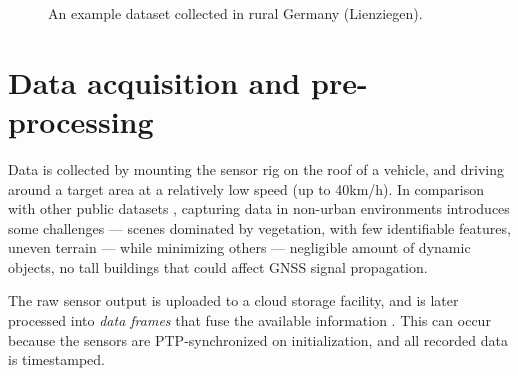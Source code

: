 \begin{figure}
	\centering
	\hspace{1pt}
	\caption[Example dataset trajectory]{An example dataset collected in rural Germany (Lienziegen).}
	\label{fig:example-trajectory}
\end{figure}


\section{Data acquisition and pre-processing}

Data is collected by mounting the sensor rig on the roof of a vehicle, and driving around a target area at a relatively low speed (\eg up to 40km/h).  In comparison with other public datasets \cite{nuscenes, pixset}, capturing data in non-urban environments introduces some challenges --- scenes dominated by vegetation, with few identifiable features, uneven terrain --- while minimizing others --- negligible amount of dynamic objects, no tall buildings that could affect GNSS signal propagation.

The raw sensor output is uploaded to a cloud storage facility, and is later processed into \emph{data frames} that fuse the available information . This can occur because the sensors are PTP-synchronized on initialization, and all recorded data is timestamped.


